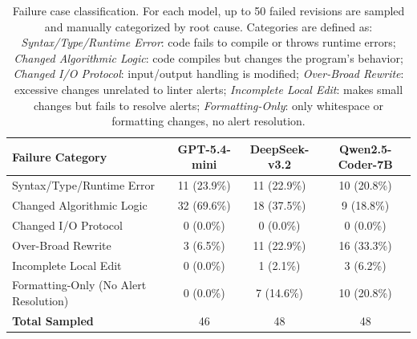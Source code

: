 \begin{table}[t]
\centering
\small
\begin{tabular}{l ccc}
\toprule
\textbf{Failure Category} & \textbf{GPT-5.4-mini} & \textbf{DeepSeek-v3.2} & \textbf{Qwen2.5-Coder-7B} \\
\midrule
Syntax/Type/Runtime Error & 11 (23.9\%) & 11 (22.9\%) & 10 (20.8\%) \\
Changed Algorithmic Logic & 32 (69.6\%) & 18 (37.5\%) & 9 (18.8\%) \\
Changed I/O Protocol & 0 (0.0\%) & 0 (0.0\%) & 0 (0.0\%) \\
Over-Broad Rewrite & 3 (6.5\%) & 11 (22.9\%) & 16 (33.3\%) \\
Incomplete Local Edit & 0 (0.0\%) & 1 (2.1\%) & 3 (6.2\%) \\
Formatting-Only (No Alert Resolution) & 0 (0.0\%) & 7 (14.6\%) & 10 (20.8\%) \\
\midrule
\textbf{Total Sampled} & 46 & 48 & 48 \\
\bottomrule
\end{tabular}
\caption{Failure case classification. For each model, up to 50 failed revisions are sampled and manually categorized by root cause. Categories are defined as: \textit{Syntax/Type/Runtime Error}: code fails to compile or throws runtime errors; \textit{Changed Algorithmic Logic}: code compiles but changes the program's behavior; \textit{Changed I/O Protocol}: input/output handling is modified; \textit{Over-Broad Rewrite}: excessive changes unrelated to linter alerts; \textit{Incomplete Local Edit}: makes small changes but fails to resolve alerts; \textit{Formatting-Only}: only whitespace or formatting changes, no alert resolution.}
\label{tab:failure_categories}
\end{table}